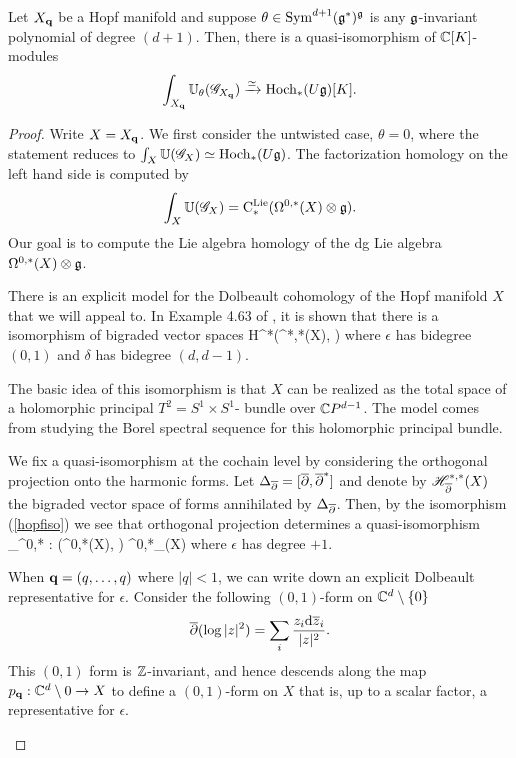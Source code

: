 \begin{prop}
\label{prop: hopf}
Let $X_{\bf q}$ be a Hopf manifold and suppose $\theta \in {\rm Sym}^{d+1}(\mathfrak g^*)^\mathfrak g$ is any $\mathfrak g$-invariant polynomial of degree $(d+1)$. 
Then, there is a quasi-isomorphism of $\mathbb C[K]$-modules
\[
\int_{X_{\bf q}} \mathbb U_\theta (\mathscr G_{X_{\bf q}}) \xrightarrow{\simeq} {\rm Hoch}_*(U \mathfrak g)[K] .
\]
\end{prop}
\begin{proof}
Write $X = X_{\bf q}$. 
We first consider the untwisted case, $\theta = 0$, where the statement reduces to $\int_X \mathbb U (\mathscr G_X) \simeq {\rm Hoch}_*(U \mathfrak g)$.
The factorization homology on the left hand side is computed by
\[
\int_X \mathbb U(\mathscr G_X) = {\rm C}^{\rm Lie}_*(\Omega^{0,*}(X) \otimes \mathfrak g) .
\]
Our goal is to compute the Lie algebra homology of the dg Lie algebra $\Omega^{0,*}(X) \otimes \mathfrak g$.  

There is an explicit model for the Dolbeault cohomology of the Hopf manifold $X$ that we will appeal to. 
In Example 4.63 of \cite{Tanre}, it is shown that there is a isomorphism of bigraded vector spaces
\beqn\label{hopfiso}
H^*\left(\Omega^{*,*}(X), \dbar\right) \cong \CC[\epsilon,\delta]
\eeqn
where $\epsilon$ has bidegree $(0,1)$ and $\delta$ has bidegree $(d,d-1)$. 

\begin{rmk}
The basic idea of this isomorphism is that $X$ can be realized as the total space of a holomorphic principal $T^2 = S^1 \times S^1$- bundle over $\mathbb C P^{d-1}$. 
The model comes from studying the Borel spectral sequence for this holomorphic principal bundle.
\end{rmk}

We fix a quasi-isomorphism at the cochain level by considering the orthogonal projection onto the harmonic forms. 
Let $\Delta_{\overline{\partial}} = [\overline{\partial},\overline{\partial}^*]$ and denote by $\mathscr H^{*,*}_{\overline{\partial}}(X)$ the bigraded vector space of forms annihilated by $\Delta_{\overline{\partial}}$. 
Then, by the isomorphism (\ref{hopfiso}) we see that orthogonal projection determines a quasi-isomorphism
\beqn\label{hopfquasi}
\pi_{\sH}^{0,*} : \left(\Omega^{0,*}(X), \dbar \right) \xto{\simeq} \sH^{0,*}_{\dbar}(X) \cong \CC[\epsilon]
\eeqn
where $\epsilon$ has degree $+1$. 


\begin{eg}
When ${\bf q} = (q,\ldots,q)$ where $|q| < 1$, we can write down an explicit Dolbeault representative for $\epsilon$. 
Consider the following $(0,1)$-form on $\mathbb C^d \setminus \{0\}$
\[
\overline{\partial} (\log |z|^2) = \sum_i \frac{z_i{\rm d} \overline{z}_i}{|z|^2} .
\]
This $(0,1)$ form is $\mathbb Z$-invariant, and hence descends along the map $p_{\bf q} : \mathbb C^d \setminus 0 \to X$ to define a $(0,1)$-form on $X$ that is, up to a scalar factor, a representative for $\epsilon$. 
\end{eg}


\end{proof}
